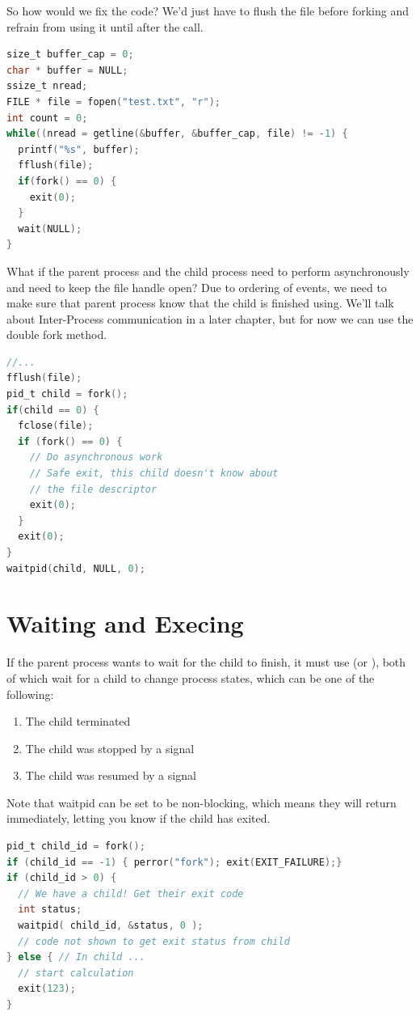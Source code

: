 So how would we fix the code?
We'd just have to flush the file before forking and refrain from using it until after the  call.

\begin{lstlisting}[language=C]
size_t buffer_cap = 0;
char * buffer = NULL;
ssize_t nread;
FILE * file = fopen("test.txt", "r");
int count = 0;
while((nread = getline(&buffer, &buffer_cap, file) != -1) {
  printf("%s", buffer);
  fflush(file);
  if(fork() == 0) { 
    exit(0);
  }
  wait(NULL);
}
\end{lstlisting}

What if the parent process and the child process need to perform asynchronously and need to keep the file handle open?
Due to ordering of events, we need to make sure that parent process know that the child is finished using.
We'll talk about Inter-Process communication in a later chapter, but for now we can use the double fork method.

\begin{lstlisting}[language=C]
//... 
fflush(file);
pid_t child = fork();
if(child == 0) { 
  fclose(file);
  if (fork() == 0) {
    // Do asynchronous work
    // Safe exit, this child doesn't know about
    // the file descriptor
    exit(0);
  }
  exit(0);
}
waitpid(child, NULL, 0);
\end{lstlisting}

\section{Waiting and Execing}

If the parent process wants to wait for the child to finish, it must use  (or ), both of which wait for a child to change process states, which can be one of the following:

\begin{enumerate}
\item The child terminated
\item The child was stopped by a signal
\item The child was resumed by a signal
\end{enumerate}

Note that waitpid can be set to be non-blocking, which means they will return immediately, letting you know if the child has exited.

\begin{lstlisting}[language=C]
pid_t child_id = fork();
if (child_id == -1) { perror("fork"); exit(EXIT_FAILURE);}
if (child_id > 0) {
  // We have a child! Get their exit code
  int status;
  waitpid( child_id, &status, 0 );
  // code not shown to get exit status from child
} else { // In child ...
  // start calculation
  exit(123);
}
\end{lstlisting}

